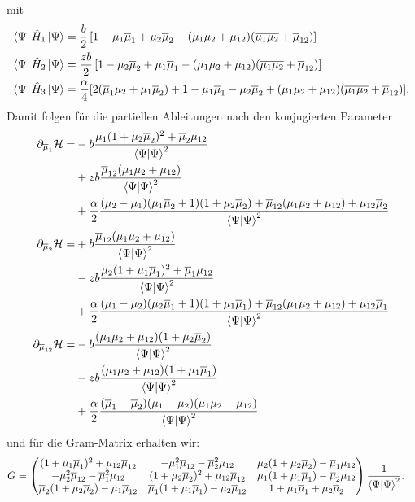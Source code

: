 mit 
\begin{align}
    \bra{\Psi}\hat{H}_1\ket{\Psi} &=  \frac{b}{2}\left[ 1- \mu_1\overline{\mu}_1 + \mu_2\overline{\mu}_2 - (\mu_1 \mu_2 + \mu_{12})(\overline{\mu_1\mu_2} + \overline{\mu}_{12})\right]\\
    \bra{\Psi}\hat{H}_2\ket{\Psi} &=  \frac{z b}{2}\left[ 1- \mu_2\overline{\mu}_2 + \mu_1\overline{\mu}_1 - (\mu_1 \mu_2 + \mu_{12})(\overline{\mu_1\mu_2} + \overline{\mu}_{12})\right] \\
    \bra{\Psi}\hat{H}_3\ket{\Psi} &= \frac{\alpha}{4}[2(\overline{\mu}_1\mu_2 + \mu_1\overline{\mu}_2) + 1 - \mu_1\overline{\mu}_1 - \mu_2\overline{\mu}_2 + (\mu_1 \mu_2 + \mu_{12})(\overline{\mu_1\mu_2} + \overline{\mu}_{12})].
\end{align}
\noindent Damit folgen für die partiellen Ableitungen nach den konjugierten Parameter
\begin{align}
    \partial_{\overline{\mu}_1} \mathcal{H} =& 
    -b \frac{\mu_1(1+\mu_2\overline{\mu}_2)^2 + \overline{\mu}_2\mu_{12}}{\bra{\Psi}\ket{\Psi}^2}\nonumber\\
    &+z b \frac{\overline{\mu}_{12}(\mu_1\mu_2 + \mu_{12})}{\bra{\Psi}\ket{\Psi}^2}\nonumber\\
    &+\frac{\alpha}{2}\frac{(\mu_2-\mu_1)(\mu_1\overline{\mu}_2+1)(1+\mu_2\overline{\mu}_2)+\overline{\mu}_{12}(\mu_1\mu_2 + \mu_{12}) + \mu_{12}\overline{\mu}_2}{\bra{\Psi}\ket{\Psi}^2}\label{dH_Q1} \\
    \partial_{\overline{\mu}_2} \mathcal{H} =& 
    +b \frac{\overline{\mu}_{12}(\mu_1\mu_2 + \mu_{12})}{\bra{\Psi}\ket{\Psi}^2} \nonumber\\
    &-z b \frac{\mu_2(1+\mu_1\overline{\mu}_1)^2 + \overline{\mu}_1\mu_{12}}{\bra{\Psi}\ket{\Psi}^2} \nonumber\\
    &+\frac{\alpha}{2}\frac{(\mu_1-\mu_2)(\mu_2\overline{\mu}_1+1)(1+\mu_1\overline{\mu}_1)+\overline{\mu}_{12}(\mu_1\mu_2 + \mu_{12}) + \mu_{12}\overline{\mu}_1}{\bra{\Psi}\ket{\Psi}^2} \\
    \partial_{\overline{\mu}_{12}} \mathcal{H} =& 
    -b\frac{(\mu_1\mu_2+\mu_{12})(1+\mu_2\overline{\mu}_2)}{\bra{\Psi}\ket{\Psi}^2} \nonumber\\
    &-zb\frac{(\mu_1\mu_2+\mu_{12})(1+\mu_1\overline{\mu}_1)}{\bra{\Psi}\ket{\Psi}^2} \nonumber\\
    &+\frac{\alpha}{2}\frac{(\overline{\mu}_1-\overline{\mu}_2)(\mu_1-\mu_2)(\mu_1\mu_2+\mu_{12})}{\bra{\Psi}\ket{\Psi}^2}\label{dH_Q12}
\end{align}
\noindent und für die Gram-Matrix erhalten wir:
\begin{align}\label{Gram_Korrektur}
    G &=
    \begin{pmatrix}
        (1+\mu_1\overline{\mu}_1)^2 + \mu_{12}\overline{\mu}_{12} & -\mu_1^2\overline{\mu}_{12} - \overline{\mu}_2^2\mu_{12} &  \mu_2(1+\mu_2\overline{\mu}_2)-\overline{\mu}_1\mu_{12}\\
        -\mu_2^2\overline{\mu}_{12} - \overline{\mu}_1^2\mu_{12} &(1+\mu_2\overline{\mu}_2)^2 + \mu_{12}\overline{\mu}_{12} & \mu_1(1+\mu_1\overline{\mu}_1)-\overline{\mu}_2\mu_{12}\\
        \overline{\mu}_2(1+\mu_2\overline{\mu}_2)-\mu_1\overline{\mu}_{12} & \overline{\mu}_1(1+\mu_1\overline{\mu}_1)-\mu_2\overline{\mu}_{12} & 1 + \mu_1\overline{\mu}_1 + \mu_2\overline{\mu}_2
    \end{pmatrix}\frac{1}{\bra{\Psi}\ket{\Psi}^2} .
\end{align}
